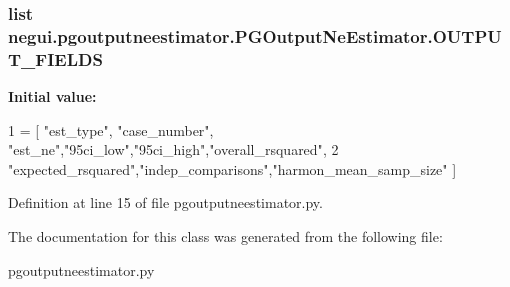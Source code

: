 \subsubsection[{\texorpdfstring{O\+U\+T\+P\+U\+T\+\_\+\+F\+I\+E\+L\+DS}{OUTPUT_FIELDS}}]{\setlength{\rightskip}{0pt plus 5cm}list negui.\+pgoutputneestimator.\+P\+G\+Output\+Ne\+Estimator.\+O\+U\+T\+P\+U\+T\+\_\+\+F\+I\+E\+L\+DS\hspace{0.3cm}{\ttfamily [static]}}\hypertarget{classnegui_1_1pgoutputneestimator_1_1PGOutputNeEstimator_aa78fb93f7acf4a769ae309f1a3b94302}{}\label{classnegui_1_1pgoutputneestimator_1_1PGOutputNeEstimator_aa78fb93f7acf4a769ae309f1a3b94302}
{\bfseries Initial value\+:}
\begin{DoxyCode}
1 = [ \textcolor{stringliteral}{"est\_type"}, \textcolor{stringliteral}{"case\_number"}, \textcolor{stringliteral}{"est\_ne"},\textcolor{stringliteral}{"95ci\_low"},\textcolor{stringliteral}{"95ci\_high"},\textcolor{stringliteral}{"overall\_rsquared"},
2                     \textcolor{stringliteral}{"expected\_rsquared"},\textcolor{stringliteral}{"indep\_comparisons"},\textcolor{stringliteral}{"harmon\_mean\_samp\_size"} ]
\end{DoxyCode}


Definition at line 15 of file pgoutputneestimator.\+py.



The documentation for this class was generated from the following file\+:\begin{DoxyCompactItemize}
\item 
pgoutputneestimator.\+py\end{DoxyCompactItemize}
